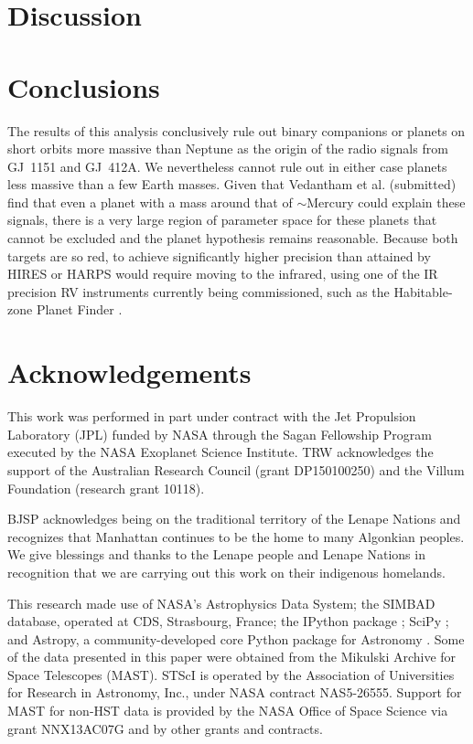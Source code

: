 \documentclass[modern]{aastex62}
\begin{document}
\section{Discussion}
\label{sec:discussion}

\section{Conclusions}
\label{sec:conclusions}

The results of this analysis conclusively rule out binary companions or planets on short orbits more massive than Neptune as the origin of the radio signals from GJ~1151 and GJ~412A. We nevertheless cannot rule out in either case planets less massive than a few Earth masses. Given that Vedantham et al. (submitted) find that even a planet with a mass around that of $\sim$Mercury could explain these signals, there is a very large region of parameter space for these planets that cannot be excluded and the planet hypothesis remains reasonable. Because both targets are so red, to achieve significantly higher precision than attained by HIRES or HARPS would require moving to the infrared, using one of the IR precision RV instruments currently being commissioned, such as the Habitable-zone Planet Finder \citep[HPF:][]{hpf}.

\section*{Acknowledgements} %

This work was performed in part under contract with the Jet Propulsion Laboratory (JPL) funded by NASA through the Sagan Fellowship Program executed by the NASA Exoplanet Science Institute. TRW acknowledges the support of the Australian Research Council (grant DP150100250) and the Villum Foundation (research grant 10118). 

BJSP acknowledges being on the traditional territory of the Lenape Nations and recognizes that Manhattan continues to be the home to many Algonkian peoples. We give blessings and thanks to the Lenape people and Lenape Nations in recognition that we are carrying out this work on their indigenous homelands.
%

This research made use of NASA's Astrophysics Data System; the SIMBAD database, operated at CDS, Strasbourg, France; the IPython package \citep{PER-GRA:2007}; SciPy \citep{scipy}; and Astropy, a community-developed core Python package for Astronomy \citep{astropy}. Some of the data presented in this paper were obtained from the Mikulski Archive for Space Telescopes (MAST). STScI is operated by the Association of Universities for Research in Astronomy, Inc., under NASA contract NAS5-26555. Support for MAST for non-HST data is provided by the NASA Office of Space Science via grant NNX13AC07G and by other grants and contracts. 
\end{document}
